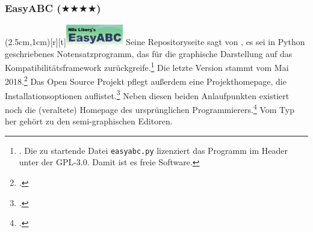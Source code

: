 %
%
%



\subsubsection{EasyABC ($\bigstar\bigstar\bigstar\bigstar$)}

\parpic(2.5cm,1cm)[r][t]{\includegraphics[width=2.5cm]{logos/easyabc-300dpi.png}}
\label{EasyABC}Seine Repositoryseite sagt von , es sei in Python
geschriebenes Notensatzprogramm, das für die graphische Darstellung auf das
Kompatibilitätsframework 
zurückgreife.\footnote{\cite[vgl.][\nopage wp]{EasyAbc2017a}. Die zu startende
Datei \texttt{easyabc.py} lizenziert das Programm im Header unter der GPL-3.0.
Damit ist es freie Software.} Die letzte Version stammt vom Mai
2018.\footcite[vgl.][\nopage wp]{EasyAbc2017c} Das Open Source Projekt pflegt
außerdem eine Projekthomepage, die Installationsoptionen
auflistet.\footcite[vgl.][\nopage wp]{EasyAbc2017b} Neben diesen beiden
Anlaufpunkten existiert noch die (veraltete) Homepage des ursprünglichen
Programmierers.\footcite[vgl.][\nopage wp]{Liberg2015a} Vom Typ her gehört
 zu den semi-graphischen Editoren.

